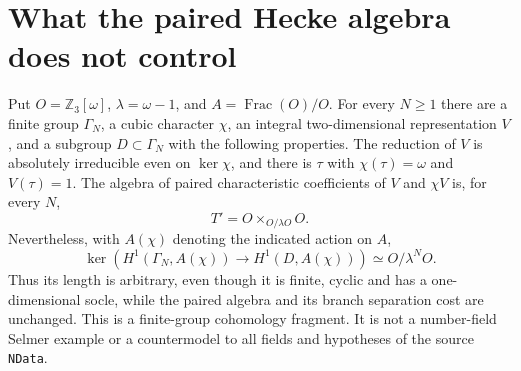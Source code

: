 \section{What the paired Hecke algebra does not control}
\label{sec:paired-algebra-selmer-limit}

\begin{proposition}
\label{AC-G43}
Put $O=\mathbb Z_3[\omega]$, $\lambda=\omega-1$, and
$A=\operatorname{Frac}(O)/O$.  For every $N\geq1$ there
are a finite group $\Gamma_N$, a cubic character $\chi$,
an integral two-dimensional representation $V$, and a
subgroup $D\subset\Gamma_N$ with the following properties.
The reduction of $V$ is absolutely irreducible even on
$\ker\chi$, and there is $\tau$ with $\chi(\tau)=\omega$
and $V(\tau)=1$.  The algebra of paired characteristic
coefficients of $V$ and $\chi V$ is, for every $N$,
\[
                     T'=O\times_{O/\lambda O}O.          \tag{G43.1}
\]
Nevertheless, with $A(\chi)$ denoting the indicated
action on $A$,
\[
 \ker\!\left(H^1(\Gamma_N,A(\chi))
                      \longrightarrow H^1(D,A(\chi))\right)
                  \simeq O/\lambda^N O.                 \tag{G43.2}
\]
Thus its length is arbitrary, even though it is finite,
cyclic and has a one-dimensional socle, while the paired
algebra and its branch separation cost are unchanged.
This is a finite-group cohomology fragment.  It is not
a number-field Selmer example or a countermodel to all
fields and hypotheses of the source \texttt{NData}.
\end{proposition}
